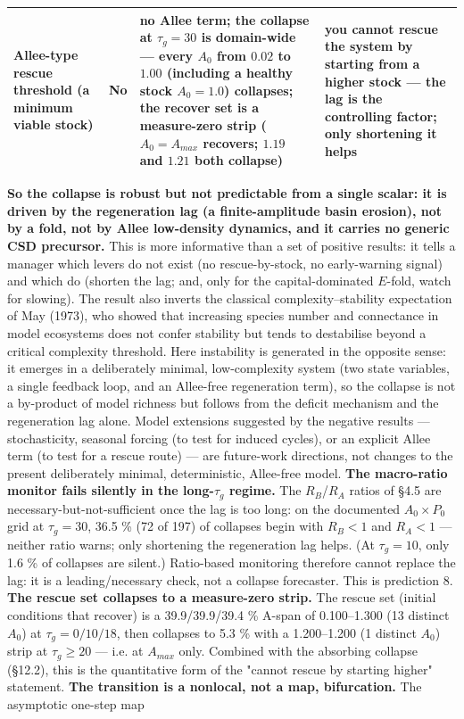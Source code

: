 \documentclass[11pt]{article}
\begin{document}
\begin{table}[htbp]
\begin{tabularx}{\textwidth}{>{\raggedright\arraybackslash}X>{\raggedright\arraybackslash}X>{\raggedright\arraybackslash}X>{\raggedright\arraybackslash}X}
Allee-type rescue threshold (a minimum viable stock) & No & no Allee term; the collapse at $\tau{}_{g}=30$ is domain-wide — every $A_{0}$ from $0.02$ to $1.00$ (including a healthy stock $A_{0}=1.0$) collapses; the recover set is a measure-zero strip ($A_{0}=A_{max}$ recovers; $1.19$ and $1.21$ both collapse) & you cannot rescue the system by starting from a higher stock — the lag is the controlling factor; only shortening it helps \\
\bottomrule
\end{tabularx}
\end{table}

\textbf{So the collapse is robust but not predictable from a single scalar: it is driven by the regeneration lag (a finite-amplitude basin erosion), not by a fold, not by Allee low-density dynamics, and it carries no generic CSD precursor.} This is more informative than a set of positive results: it tells a manager which levers do not exist (no rescue-by-stock, no early-warning signal) and which do (shorten the lag; and, only for the capital-dominated $E$-fold, watch for slowing). The result also inverts the classical complexity–stability expectation of May (1973), who showed that increasing species number and connectance in model ecosystems does not confer stability but tends to destabilise beyond a critical complexity threshold. Here instability is generated in the opposite sense: it emerges in a deliberately minimal, low-complexity system (two state variables, a single feedback loop, and an Allee-free regeneration term), so the collapse is not a by-product of model richness but follows from the deficit mechanism and the regeneration lag alone. Model extensions suggested by the negative results — stochasticity, seasonal forcing (to test for induced cycles), or an explicit Allee term (to test for a rescue route) — are future-work directions, not changes to the present deliberately minimal, deterministic, Allee-free model. \textbf{The macro-ratio monitor fails silently in the long-$\tau{}_{g}$ regime.} The $R_{B}$/$R_{A}$ ratios of §4.5 are necessary-but-not-sufficient once the lag is too long: on the documented $A_{0}\times{}P_{0}$ grid at $\tau{}_{g} = 30$, 36.5 \% (72 of 197) of collapses begin with $R_{B} < 1$ and $R_{A} < 1$ — neither ratio warns; only shortening the regeneration lag helps. (At $\tau{}_{g} = 10$, only 1.6 \% of collapses are silent.) Ratio-based monitoring therefore cannot replace the lag: it is a leading/necessary check, not a collapse forecaster. This is prediction 8. \textbf{The rescue set collapses to a measure-zero strip.} The rescue set (initial conditions that recover) is a 39.9/39.9/39.4 \% A-span of 0.100–1.300 (13 distinct $A_{0}$) at $\tau{}_{g} = 0/10/18$, then collapses to 5.3 \% with a 1.200–1.200 (1 distinct $A_{0}$) strip at $\tau{}_{g} \geq{} 20$ — i.e. at $A_{max}$ only. Combined with the absorbing collapse (§12.2), this is the quantitative form of the "cannot rescue by starting higher" statement. \textbf{The transition is a nonlocal, not a map, bifurcation.} The asymptotic one-step map 
\end{document}

